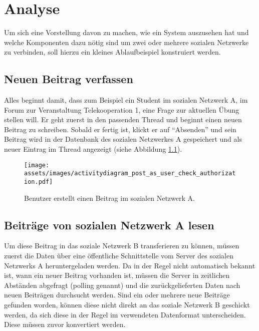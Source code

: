 
\chapter{Analyse} %
\label{cha:analyse}


Um sich eine Vorstellung davon zu machen, wie ein System auszusehen hat und welche Komponenten dazu nötig sind um zwei oder mehrere sozialen Netzwerke zu verbinden, soll hierzu ein kleines Ablaufbeispiel konstruiert werden.

\section{Neuen Beitrag verfassen} %
\label{sec:neuen_beitrag_verfassen}


Alles beginnt damit, dass zum Beispiel ein Student im sozialen Netzwerk A, im Forum zur Veranstaltung Telekooperation 1, eine Frage zur aktuellen Übung stellen will. Er geht zuerst in den passenden Thread und beginnt einen neuen Beitrag zu schreiben. Sobald er fertig ist, klickt er auf \enquote{Absenden} und sein Beitrag wird in der Datenbank des sozialen Netzwerkes A gespeichert und als neuer Eintrag im Thread angezeigt (siehe Abbildung \ref{fig:beutzer_erstellt_beitrag_a}).

\medskip

\begin{figure}[ht]
     \texttt{[image: assets/images/activitydiagram\_post\_as\_user\_check\_authorization.pdf]}
    \caption{Benutzer erstellt einen Beitrag im sozialen Netzwerk A.}
    \label{fig:beutzer_erstellt_beitrag_a}
\end{figure}

\section{Beiträge von sozialen Netzwerk A lesen} %
\label{sec:beiträge_von_solzialen_netzwerk_a_lesen}


Um diese Beitrag in das soziale Netzwerk B transferieren zu können, müssen zuerst die Daten über eine öffentliche Schnittstelle vom Server des sozialen Netzwerks A heruntergeladen werden. Da in der Regel nicht automatisch bekannt ist, wann ein neuer Beitrag vorhanden ist, müssen die Server in zeitlichen Abständen abgefragt (polling genannt) und die zurückgelieferten Daten nach neuen Beiträgen durchsucht werden. Sind ein oder mehrere neue Beiträge gefunden worden, können diese nicht direkt an das soziale Netzwerk B geschickt werden, da sich diese in der Regel im verwendeten Datenformat unterscheiden. Diese müssen zuvor konvertiert werden.

